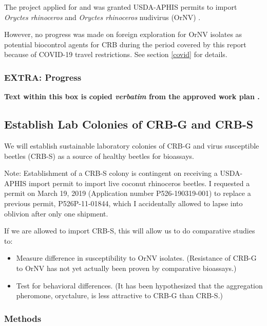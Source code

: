\documentclass[12pt,letterpaper,english,bibliography=totocnumbered,abstract=on]{scrartcl}
\begin{document}
The project applied for and was granted USDA-APHIS permits to import \textit{Oryctes rhinoceros} \cite{usda-aphis_crb_2019} and \textit{Oryctes rhinoceros} nudivirus (OrNV) \cite{usda-aphisImportPermitOrNV2020}.

However, no progress was made on foreign exploration for OrNV isolates as potential biocontrol agents for CRB during the period covered by this report because of COVID-19 travel restrictions. See section \ref{covid} for details.

\subsubsection{EXTRA: Progress}

\newpage
\begin{framed}
	
\textbf{Text within this box is copied \emph{verbatim} from the approved work plan \cite{mooreWorkPlanAPHISPPA2020}.} 
	
\subsection{Establish Lab Colonies of CRB-G and CRB-S}

We will establish sustainable laboratory colonies of CRB-G and virus susceptible beetles (CRB-S) as a source of healthy beetles for bioassays.

Note: Establishment of a CRB-S colony is contingent on receiving a USDA-APHIS import permit to import live coconut rhinoceros beetles. I requested a permit on March 19, 2019 (Application number P526-190319-001) to replace a previous permit, P526P-11-01844, which I accidentally allowed to lapse into oblivion after only one shipment.

If we are allowed to import CRB-S, this will allow us to do comparative studies to:

\begin{itemize}
\item Measure difference in susceptibility to OrNV isolates. (Resistance of CRB-G to OrNV has not yet actually been proven by comparative bioassays.)
\item Test for behavioral differences. (It has been hypothesized that the aggregation pheromone, oryctalure, is less attractive to CRB-G than CRB-S.)
\end{itemize}

\subsubsection*{Methods}


\end{framed}
\end{document}
